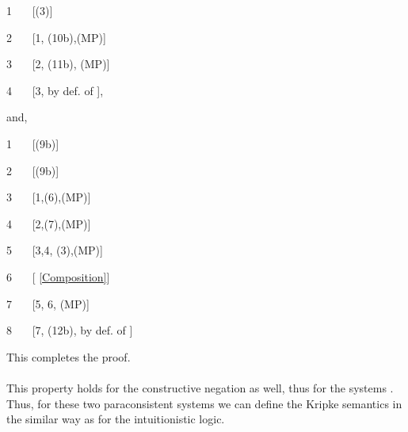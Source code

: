 \documentclass{llncs}
\begin{document}
1 \ \ \ 
\hfill[(3)]

2 \ \ \  \hfill[1, (10b),(MP)]

3 \ \ \ 
\hfill[2, (11b), (MP)]

4 \ \ \  \hfill[3, by def. of ],

 and,

 1 \ \ \ 
\hfill[(9b)]

2 \ \ \  \hfill[(9b)]

3 \ \ \  \hfill[1,(6),(MP)]

4 \ \ \  \hfill[2,(7),(MP)]

5 \ \ \  \hfill[3,4, (3),(MP)]

6 \ \ \  \hfill[ \eqref{Composition}]

7 \ \ \ 
\hfill[5, 6, (MP)]

8 \ \ \  \hfill[7,
(12b), by def. of ]

This completes the proof.
\\\\
This property holds for the constructive negation as well, thus for
the systems .\\
Thus, for these two paraconsistent systems we can define the Kripke
semantics in the similar way as for the intuitionistic logic.
\end{document}
